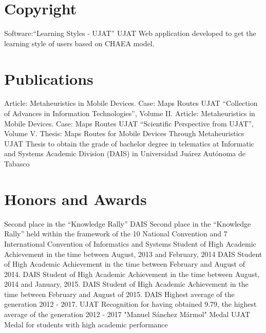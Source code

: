 \documentclass[]{friggeri-cv}
\begin{document}
\section{Copyright}
\begin{entrylist}
          {Software:“Learning Styles - UJAT”}
          {UJAT}
          {Web application developed to get the learning style of users based on CHAEA model.}
\end{entrylist}
\section{Publications}
\begin{entrylist}
          {Article: Metaheuristics in Mobile Devices. Case: Maps Routes}
          {UJAT}
          {“Collection of Advances in Information Technologies”, Volume II. }
          {Article: Metaheuristics in Mobile Devices. Case: Maps Routes}
          {UJAT}
          {“Scientific Perspective from UJAT”, Volume V.}
          {Thesis: Maps Routes for Mobile Devices Through Metaheuristics}
          {UJAT}
          {Thesis to obtain the grade of bachelor degree in telematics at Informatic and Systems Academic Division (DAIS) in Universidad Juárez Autónoma de Tabasco}    
\end{entrylist}
\section{Honors and Awards}
\begin{entrylist}
          {Second place in the “Knowledge Rally”}
          {DAIS}
          {Second place in the “Knowledge Rally” held within the framework of the 10 National Convention and 7 International Convention of Informatics and Systems}
          {Student of High Academic Achievement in the time between August, 2013 and February, 2014}
          {DAIS}
          {}
          {Student of High Academic Achievement in the time between February and August of 2014.}
          {DAIS}
          {}
          {Student of High Academic Achievement in the time between August, 2014 and January, 2015.}
          {DAIS}
          {}
          {Student of High Academic Achievement in the time between February and August of 2015.}
          {DAIS}
          {}
          {Highest average of the generation 2012 - 2017.}
          {UJAT}
          {Recognition for having obtained 9.79, the highest average of the generation 2012 - 2017}
          {"Manuel Sánchez Mármol" Medal}
          {UJAT}
          {Medal for students with high academic performance}
\end{entrylist}
\newline
\newline
\newline
\newline
\newline
\newline
\newline
\newline
\newline
\newline
\end{document}
